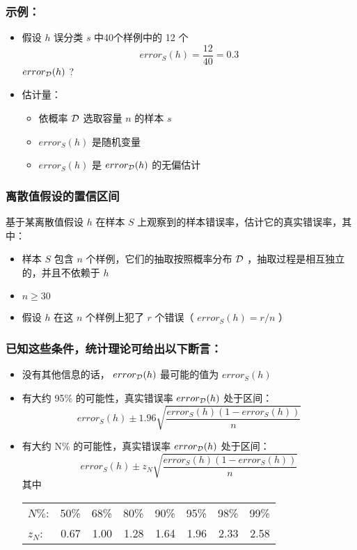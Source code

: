 \documentclass{beamer}
\begin{document}
\begin{frame}
\frametitle{示例：}
\label{sec-2-4}


\begin{itemize}
\item 假设 $h$ 误分类 $s$ 中40个样例中的 12 个
  \[error_{S}(h) = \frac{12}{40} = 0.3\]
   $error_{\cal{D}}(h)$ ?
\item 估计量：
\begin{itemize}
\item 依概率 $\cal{D}$ 选取容量 $n$ 的样本 $s$
\item $error_{S}(h)$ 是随机变量
\item $error_{S}(h)$ 是 $error_{\cal{D}}(h)$ 的无偏估计
\end{itemize}
\end{itemize}
\end{frame}
\begin{frame}
\frametitle{离散值假设的置信区间}
\label{sec-2-5}

基于某离散值假设 $h$ 在样本 $S$ 上观察到的样本错误率，估计它的真实错误率，其中：
\begin{itemize}
\item 样本 $S$ 包含 $n$ 个样例，它们的抽取按照概率分布 $\cal D$ ，抽取过程是相互独立的，并且不依赖于 $h$
\item $n\geq 30$
\item 假设 $h$ 在这 $n$ 个样例上犯了 $r$ 个错误（ $error_S(h)=r/n$ ）
\end{itemize}
\end{frame}
\begin{frame}
\frametitle{已知这些条件，统计理论可给出以下断言：}
\label{sec-2-6}

\begin{itemize}
\item 没有其他信息的话， $error_{\cal{D}}(h)$ 最可能的值为 $error_S(h)$
\item 有大约 95\% 的可能性，真实错误率 $error_{\cal{D}}(h)$ 处于区间：
  $$error_{S}(h) \pm 1.96 \sqrt{\frac{error_{S}(h) (1 - error_{S}(h))}{n}}$$
\item 有大约 N\% 的可能性，真实错误率 $error_{\cal{D}}(h)$ 处于区间：
  $$error_{S}(h) \pm z_{N} \sqrt{\frac{error_{S}(h) (1 - error_{S}(h))}{n}}$$
    其中

\begin{center}
\begin{tabular}{lrrrrrrr}
 $N\%$:    &  50\%  &  68\%  &  80\%  &  90\%  &  95\%  &  98\%  &  99\%  \\
 $z_{N}$:  &  0.67  &  1.00  &  1.28  &  1.64  &  1.96  &  2.33  &  2.58  \\
\end{tabular}
\end{center}


\end{itemize}
\end{frame}
\end{document}
